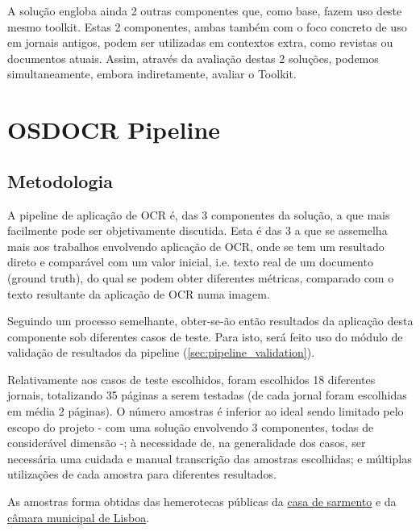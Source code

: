 A solução engloba ainda 2 outras componentes que, como base, fazem uso deste mesmo toolkit. Estas 2 componentes, ambas também com o foco concreto de uso em jornais antigos, podem ser utilizadas em contextos extra, como revistas ou documentos atuais. Assim, através da avaliação destas 2 soluções, podemos simultaneamente, embora indiretamente, avaliar o Toolkit.



\section{OSDOCR Pipeline}


\subsection{Metodologia}


A pipeline de aplicação de OCR é, das 3 componentes da solução, a que mais facilmente pode ser objetivamente discutida. Esta é das 3 a que se assemelha mais aos trabalhos envolvendo aplicação de OCR, onde se tem um resultado direto e comparável com um valor inicial, i.e. texto real de um documento (ground truth), do qual se podem obter diferentes métricas, comparado com o texto resultante da aplicação de OCR numa imagem.

Seguindo um processo semelhante, obter-se-ão então resultados da aplicação desta componente sob diferentes casos de teste. Para isto, será feito uso do módulo de validação de resultados da pipeline (\ref{sec:pipeline_validation}).

Relativamente aos casos de teste escolhidos, foram escolhidos 18 diferentes jornais, totalizando 35 páginas a serem testadas (de cada jornal foram escolhidas em média 2 páginas). O número amostras é inferior ao ideal sendo limitado pelo escopo do projeto - com uma solução envolvendo 3 componentes, todas de considerável dimensão -; à necessidade de, na generalidade dos casos, ser necessária uma cuidada e manual transcrição das amostras escolhidas; e múltiplas utilizações de cada amostra para diferentes resultados.

As amostras forma obtidas das hemerotecas públicas da \href{https://www.csarmento.uminho.pt/site/s/hemeroteca-bpb/page/hemeroteca-digital-da-bpb}{casa de sarmento} e da \href{https://hemerotecadigital.lisboa.pt/publicacoes}{câmara municipal de Lisboa}.


